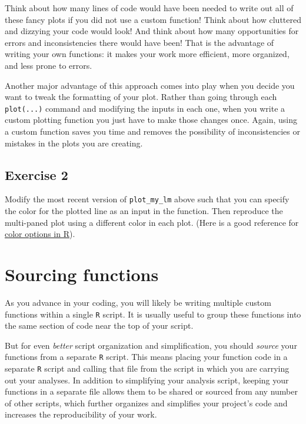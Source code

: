 \documentclass[
]{book}
\begin{document}
Think about how many lines of code would have been needed to write out all of these fancy plots if you did not use a custom function! Think about how cluttered and dizzying your code would look! And think about how many opportunities for errors and inconsistencies there would have been! That is the advantage of writing your own functions: it makes your work more efficient, more organized, and less prone to errors.

Another major advantage of this approach comes into play when you decide you want to tweak the formatting of your plot. Rather than going through each \texttt{plot(...)} command and modifying the inputs in each one, when you write a custom plotting function you just have to make those changes once. Again, using a custom function saves you time and removes the possibility of inconsistencies or mistakes in the plots you are creating.

\hypertarget{exercise-2-6}{%
\subsection*{Exercise 2}\label{exercise-2-6}}

Modify the most recent version of \texttt{plot\_my\_lm} above such that you can specify the color for the plotted line as an input in the function. Then reproduce the multi-paned plot using a different color in each plot. (Here is a good reference for \href{http://www.stat.columbia.edu/~tzheng/files/Rcolor.pdf}{color options in R}).

\hypertarget{sourcing-functions}{%
\section*{Sourcing functions}\label{sourcing-functions}}

As you advance in your coding, you will likely be writing multiple custom functions within a single \texttt{R} script. It is usually useful to group these functions into the same section of code near the top of your script.

But for even \emph{better} script organization and simplification, you should \emph{source} your functions from a separate \texttt{R} script. This means placing your function code in a separate \texttt{R} script and calling that file from the script in which you are carrying out your analyses. In addition to simplifying your analysis script, keeping your functions in a separate file allows them to be shared or sourced from any number of other scripts, which further organizes and simplifies your project's code and increases the reproducibility of your work.
\end{document}
